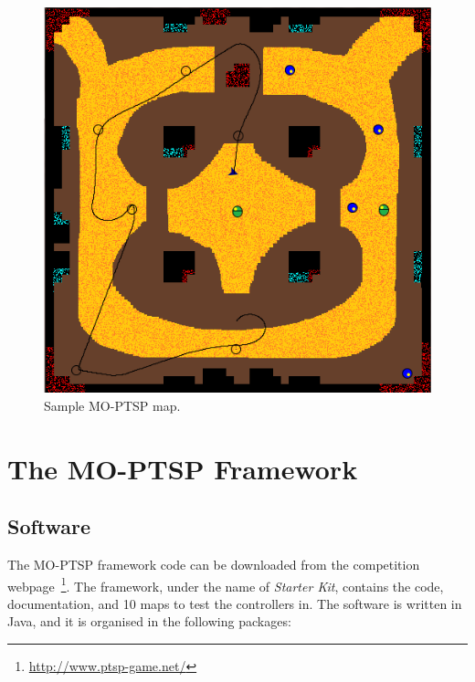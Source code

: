 \documentclass[conference]{IEEEtran}
\begin{document}
\begin{figure} [!h]
	\begin{center}
	\includegraphics[scale=0.5]{img/sampleMap}
	\caption{Sample MO-PTSP map.}
	\label{fig:sampleMap}
	\end{center}
\end{figure}


\section{The MO-PTSP Framework}


\subsection{Software}

The MO-PTSP framework code can be downloaded from the competition webpage~\footnote{\url{http://www.ptsp-game.net/}}. The framework, under the name of \textit{Starter Kit}, contains the code, documentation, and 10 maps to test the controllers in. The software is written in Java, and it is organised in the following packages:
\end{document}
